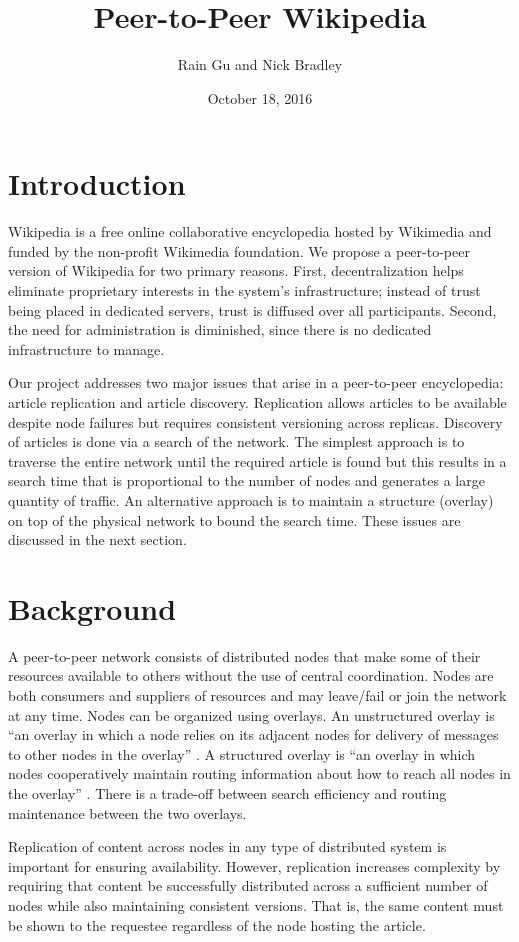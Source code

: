 \documentclass{article}
\title{Peer-to-Peer Wikipedia}
\author{Rain Gu and Nick Bradley}
\date{October 18, 2016}
\begin{document}
\maketitle

\section{Introduction}
Wikipedia is a free online collaborative encyclopedia hosted by Wikimedia and
funded by the non-profit Wikimedia foundation. We propose a peer-to-peer version
of Wikipedia for two primary reasons. First, decentralization helps eliminate
proprietary interests in the system's infrastructure; instead of trust being
placed in dedicated servers, trust is diffused over all participants. Second,
the need for administration is diminished, since there is no dedicated
infrastructure to manage.

Our project addresses two major issues that arise in a peer-to-peer encyclopedia:
article replication and article discovery. Replication allows articles to be
available despite node failures but requires consistent versioning across replicas.
Discovery of articles is done via a search of the network. The simplest approach
is to traverse the entire network until the required article is found but this
results in a search time that is proportional to the number of nodes and generates
a large quantity of traffic. An alternative approach is to maintain a structure (overlay)
on top of the physical network to bound the search time. These issues are discussed
in the next section.

\section{Background}
A peer-to-peer network consists of distributed nodes that make some of their
resources available to others without the use of central coordination. Nodes are
both consumers and suppliers of resources and may leave/fail or join the network
at any time. Nodes can be organized using overlays. An unstructured overlay is
\enquote{an overlay in which a node relies on its adjacent nodes for delivery of
messages to other nodes in the overlay} \cite{byl08}. A structured overlay is
\enquote{an overlay in which nodes cooperatively maintain routing information
about how to reach all nodes in the overlay} \cite{byl08}. There is a trade-off
between search efficiency and routing maintenance between the two overlays.

Replication of content across nodes in any type of distributed system is important
for ensuring availability. However, replication increases complexity by requiring
that content be successfully distributed across a sufficient number of nodes while also
maintaining consistent versions. That is, the same content must be shown to the
requestee regardless of the node hosting the article.
\end{document}
